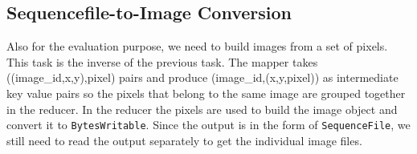\documentclass{acm_proc_article-sp}
\begin{document}

\subsection{Sequencefile-to-Image Conversion}
Also for the evaluation purpose, we need to build images from a set of pixels. This task is the inverse of the previous task. The mapper takes ((image\_id,x,y),pixel) pairs and produce (image\_id,(x,y,pixel)) as intermediate key value pairs so the pixels that belong to the same image are grouped together in the reducer. In the reducer the pixels are used to build the image object and convert it to \texttt{BytesWritable}. Since the output is in the form of \texttt{SequenceFile}, we still need to read the output separately to get the individual image files.
\end{document}
